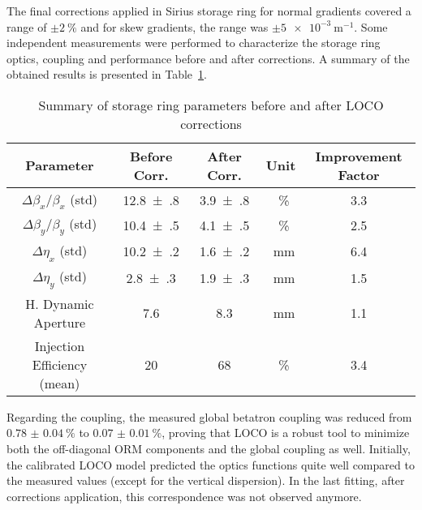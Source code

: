     The final corrections applied in Sirius storage ring for normal gradients covered a range of $\pm\SI{2}{\%}$ and for skew gradients, the range was $\pm\SI{5e-3}{\meter^{-1}}$. Some independent measurements were performed to characterize the storage ring optics, coupling and performance before and after corrections. A summary of the obtained results is presented in Table~\ref{tab:params_corr_summary}.
\begin{table}
    \centering
    \caption{Summary of storage ring parameters before and after LOCO corrections}
    \label{tab:params_corr_summary}
    \begin{tabular}{ccccc}
        \toprule\toprule
        Parameter & Before Corr. & After Corr. & Unit & Improvement Factor\\
        \hline
        $\Delta\beta_x/\beta_x$ (std) & \num{12.8(8)} & \num{3.9(8)} & \SI{}{\%} & \num{3.3} \\
        $\Delta\beta_y/\beta_y$ (std) & \num{10.4(5)} & \num{4.1(5)} & \SI{}{\%} & \num{2.5} \\
        $\Delta\eta_x$ (std) &  \num{10.2(2)} &  \num{1.6(2)} & \SI{}{\milli\meter} & \num{6.4} \\
        $\Delta\eta_y$ (std) &  \num{2.8(3)} &  \num{1.9(3)} & \SI{}{\milli\meter}& \num{1.5} \\
        H. Dynamic Aperture  & \num{7.6} & \num{8.3} & \SI{}{\milli\meter} & \num{1.1} \\
        Injection Efficiency (mean)  & \num{20} & \num{68} & \SI{}{\%} & \num{3.4} \\
        \bottomrule\bottomrule
    \end{tabular}
\end{table}

Regarding the coupling, the measured global betatron coupling was reduced from $\SI{0.78(4)}{\%}$ to $\SI{0.07(1)}{\%}$, proving that LOCO is a robust tool to minimize both the off-diagonal ORM components and the global coupling as well. Initially, the calibrated LOCO model predicted the optics functions quite well compared to the measured values (except for the vertical dispersion). In the last fitting, after corrections application, this correspondence was not observed anymore. 

